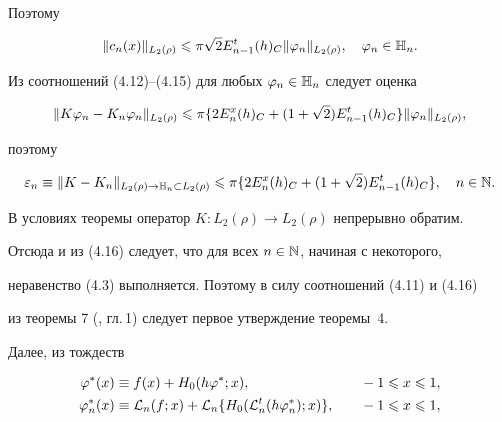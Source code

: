 Поэтому


\begin{equation}


\|c_n(x)\|_{L_2(\rho)}\lea \pi\sqrt{2}E_{n-1}^t(h)_C\|\vp_n\|_{L_2(\rho)},


\quad \vp_n\in \bH_n.


\end{equation}





Из соотношений (4.12)--(4.15) для любых $\varphi_n\in \Bbb{H}_n$ следует оценка


$$


\|K\vp_n - K_n\vp_n\|_{L_2(\rho)}\lea


\pi \{2E_n^x(h)_C+(1+\sqrt{2})E_{n-1}^t(h)_C\}\|\vp_n\|_{L_2(\rho)},


$$


поэтому


\begin{equation}


\ve_n \equiv \|K - K_n\|_{L_2(\rho)\to \bH_n \subset L_2(\rho)}\lea


\pi\{2E_n^x(h)_C+(1+\sqrt{2})E_{n-1}^t(h)_C\},\quad n\in \N.


\end{equation}





В условиях теоремы оператор $K:L_2(\rho)\to L_2(\rho)$ непрерывно обратим. 


Отсюда и из (4.16) следует, что для всех $n\in\Bbb{N}$, начиная с некоторого, 


неравенство (4.3) выполняется. Поэтому в силу соотношений (4.11) и (4.16) 


из теоремы 7 (\cite{3}, гл.\,1) следует первое утверждение теоремы~4.





Далее, из тождеств


\begin{alignat}{2}


\vp^*(x) &\equiv f(x)+H_0(h\vp^*;x),&\quad & -1\lea x\lea 1, \\


%


\vp_n^*(x) &\equiv \rL_n(f;x)+\rL_n\{H_0(\rL_n^t(h\vp_n^*);x)\},


&\quad & -1\lea x\lea 1,


\end{alignat}


